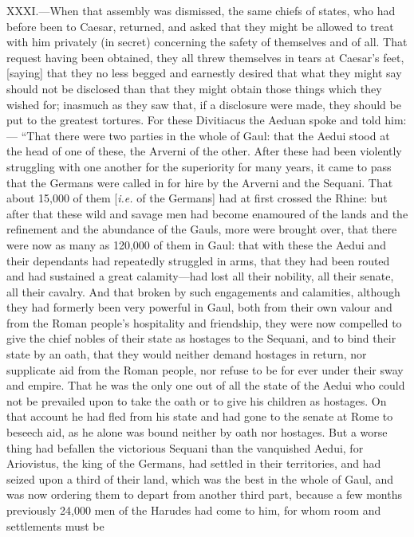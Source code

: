 XXXI.—When that assembly was dismissed, the same chiefs of states, who
had before been to Caesar, returned, and asked that they might be
allowed to treat with him privately (in secret) concerning the safety of
themselves and of all. That request having been obtained, they all threw
themselves in tears at Caesar's feet, [saying] that they no less begged
and earnestly desired that what they might say should not be disclosed
than that they might obtain those things which they wished for; inasmuch
as they saw that, if a disclosure were made, they should be put to the
greatest tortures. For these Divitiacus the Aeduan spoke and told him:—
``That there were two parties in the whole of Gaul: that the Aedui stood
at the head of one of these, the Arverni of the other. After these had
been violently struggling with one another for the superiority for many
years, it came to pass that the Germans were called in for hire by the
Arverni and the Sequani. That about 15,000 of them [\emph{i.e.} of the
Germans] had at first crossed the Rhine: but after that these wild and
savage men had become enamoured of the lands and the refinement and the
abundance of the Gauls, more were brought over, that there were now as
many as 120,000 of them in Gaul: that with these the Aedui and their
dependants had repeatedly struggled in arms, that they had been routed
and had sustained a great calamity—had lost all their nobility, all
their senate, all their cavalry. And that broken by such engagements and
calamities, although they had formerly been very powerful in Gaul, both
from their own valour and from the Roman people's hospitality and
friendship, they were now compelled to give the chief nobles of their
state as hostages to the Sequani, and to bind their state by an oath,
that they would neither demand hostages in return, nor supplicate aid
from the Roman people, nor refuse to be for ever under their sway and
empire. That he was the only one out of all the state of the Aedui who
could not be prevailed upon to take the oath or to give his children as
hostages. On that account he had fled from his state and had gone to the
senate at Rome to beseech aid, as he alone was bound neither by oath nor
hostages. But a worse thing had befallen the victorious Sequani than the
vanquished Aedui, for Ariovistus, the king of the Germans, had settled
in their territories, and had seized upon a third of their land, which
was the best in the whole of Gaul, and was now ordering them to depart
from another third part, because a few months previously 24,000 men of
the Harudes had come to him, for whom room and settlements must be

